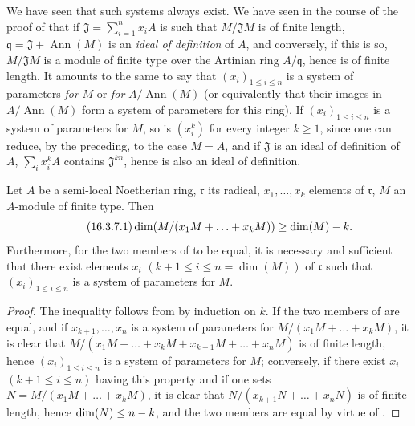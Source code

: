 We have seen  that such systems always exist.
We have seen in the course of the proof of  that if $\mathfrak{J}=\sum_{i=1}^n x_i A$ is such that $M/\mathfrak{J}M$ is of finite length, $\mathfrak{q}=\mathfrak{J}+\operatorname{Ann}(M)$ is an \emph{ideal of definition} of $A$, and conversely, if this is so, $M/\mathfrak{J}M$ is a module of finite type over the Artinian ring $A/\mathfrak{q}$, hence is of finite length.
It amounts to the same to say that $(x_i)_{1\leq i\leq n}$ is a system of parameters \emph{for} $M$ or \emph{for} $A/\operatorname{Ann}(M)$ (or equivalently that their images in $A/\operatorname{Ann}(M)$ form a system of parameters for this ring).
If $(x_i)_{1\leq i\leq n}$ is a system of parameters for $M$, so is $(x_i^k)$ for every integer $k\geq 1$, since one can reduce, by the preceding, to the case $M=A$, and if $\mathfrak{J}$ is an ideal of definition of $A$, $\sum_i x_i^k A$ contains $\mathfrak{J}^{kn}$, hence is also an ideal of definition.

\begin{proposition}[16.3.7]
\label{0.16.3.7}
Let $A$ be a semi-local Noetherian ring, $\mathfrak{r}$ its radical, $x_1,\ldots,x_k$ elements of $\mathfrak{r}$, $M$ an $A$-module of finite type.
Then
\begin{equation}
\label{0.16.3.7.1}
\tag{16.3.7.1}
  \dim(M/(x_1M+\ldots+x_k M))\geq\dim(M)- k.
\end{equation}
Furthermore, for the two members of  to be equal, it is necessary and sufficient that there exist elements $x_i$ $(k+1\leq i\leq n=\dim(M))$ of $\mathfrak{r}$ such that $(x_i)_{1\leq i\leq n}$ is a system of parameters for $M$.
\end{proposition}

\begin{proof}
The inequality  follows from  by induction on $k$.
If the two members of  are equal, and if $x_{k+1},\ldots,x_n$ is a system of parameters for $M/(x_1M+\ldots+x_k M)$, it is clear that $M/(x_1M+\ldots+x_k M+x_{k+1}M+\ldots+x_n M)$ is of finite length, hence $(x_i)_{1\leq i\leq n}$ is a system of parameters for $M$; conversely, if there exist $x_i$ $(k+1\leq i\leq n)$ having this property and if one sets $N=M/(x_1M+\ldots+x_k M)$, it is clear that $N/(x_{k+1}N+\ldots+x_n N)$ is of finite length, hence $\dim(N)\leq n- k$, and the two members are equal by virtue of .
\end{proof}

